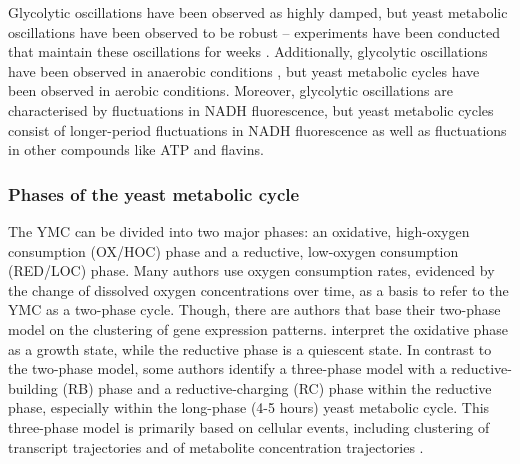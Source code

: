 Glycolytic oscillations have been observed as highly damped, but yeast metabolic oscillations have been observed to be robust -- experiments have been conducted that maintain these oscillations for weeks \parencite{lloydRedoxRhythmicityClocks2007}.
Additionally, glycolytic oscillations have been observed in anaerobic conditions \citep{lloydSaccharomycesCerevisiaeOscillatory2019}, but yeast metabolic cycles have been observed in aerobic conditions.
Moreover, glycolytic oscillations are characterised by fluctuations in NADH fluorescence, but yeast metabolic cycles consist of longer-period fluctuations in NADH fluorescence as well as fluctuations in other compounds like ATP and flavins.

\subsubsection{Phases of the yeast metabolic cycle}
\label{subsubsec:intro-ymc-definition-phases}
The YMC can be divided into two major phases: an oxidative, high-oxygen consumption (OX/HOC) phase and a reductive, low-oxygen consumption (RED/LOC) phase.
Many authors \citep{slavovMetabolicCyclingCell2011, murrayRedoxRegulationRespiring2011, caustonMetabolicRhythmsFramework2018} use oxygen consumption rates, evidenced by the change of dissolved oxygen concentrations over time, as a basis to refer to the YMC as a two-phase cycle.
Though, there are authors \citep{machneYinYangYeast2012} that base their two-phase model on the clustering of gene expression patterns.
\citet{krishnaMinimalPushPull2018} interpret the oxidative phase as a growth state, while the reductive phase is a quiescent state.
In contrast to the two-phase model, some authors identify a three-phase model with a reductive-building (RB) phase and a reductive-charging (RC) phase within the reductive phase, especially within the long-phase (4-5 hours) yeast metabolic cycle.
This three-phase model is primarily based on cellular events, including clustering of transcript trajectories \citep{tuLogicYeastMetabolic2005} and of metabolite concentration trajectories \citep{tuCyclicChangesMetabolic2007}.
